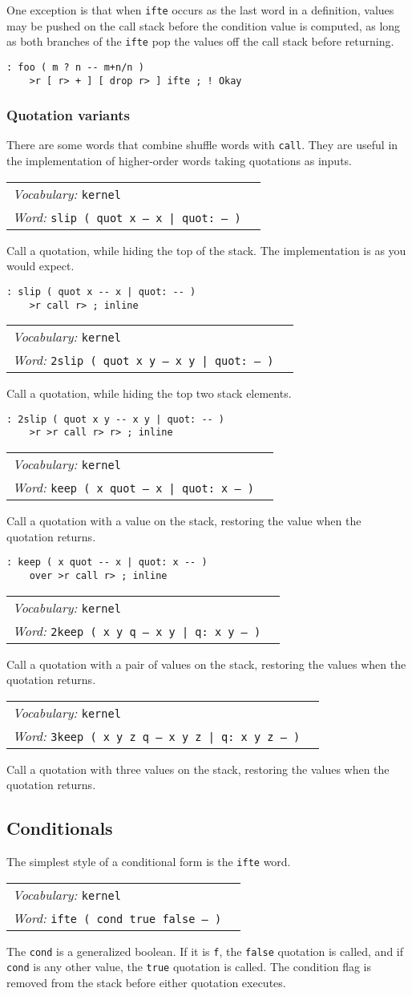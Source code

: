 \documentclass{book}
\newcommand{\vocabulary}[1]{\emph{Vocabulary:} \texttt{#1}&\\}
\newcommand{\ordinaryword}[2]{\index{\texttt{#1}}\emph{Word:} \texttt{#2}&\\}
\newcommand{\wordtable}[1]{


\begin{tabularx}{12cm}{lX}
\hline
#1
\hline
\end{tabularx}

}
\begin{document}
One exception is that when \texttt{ifte} occurs as the last word in a definition, values may be pushed on the call stack before the condition value is computed, as long as both branches of the \texttt{ifte} pop the values off the call stack before returning.
\begin{verbatim}
: foo ( m ? n -- m+n/n )
    >r [ r> + ] [ drop r> ] ifte ; ! Okay
\end{verbatim}

\subsubsection{Quotation variants}

There are some words that combine shuffle words with \texttt{call}. They are useful in the implementation of higher-order words taking quotations as inputs.
\wordtable{
\vocabulary{kernel}
\ordinaryword{slip}{slip ( quot x -- x | quot:~-- )}
}
Call a quotation, while hiding the top of the stack. The implementation is as you would expect.
\begin{verbatim}
: slip ( quot x -- x | quot: -- )
    >r call r> ; inline
\end{verbatim}
\wordtable{
\vocabulary{kernel}
\ordinaryword{2slip}{2slip ( quot x y -- x y | quot:~-- )}
}
Call a quotation, while hiding the top two stack elements.
\begin{verbatim}
: 2slip ( quot x y -- x y | quot: -- )
    >r >r call r> r> ; inline
\end{verbatim}
\wordtable{
\vocabulary{kernel}
\ordinaryword{keep}{keep ( x quot -- x | quot:~x -- )}
}
Call a quotation with a value on the stack, restoring the value when the quotation returns.
\begin{verbatim}
: keep ( x quot -- x | quot: x -- )
    over >r call r> ; inline
\end{verbatim}
\wordtable{
\vocabulary{kernel}
\ordinaryword{2keep}{2keep ( x y q -- x y | q:~x y -- )}
}
Call a quotation with a pair of values on the stack, restoring the values when the quotation returns.
\wordtable{
\vocabulary{kernel}
\ordinaryword{3keep}{3keep ( x y z q -- x y z | q:~x y z -- )}
}
Call a quotation with three values on the stack, restoring the values when the quotation returns.

\subsection{Conditionals}

The simplest style of a conditional form is the \texttt{ifte} word.
\wordtable{
\vocabulary{kernel}
\ordinaryword{ifte}{ifte ( cond true false -- )}
}
The \texttt{cond} is a generalized boolean. If it is \texttt{f}, the \texttt{false} quotation is called, and if \texttt{cond} is any other value, the \texttt{true} quotation is called. The condition flag is removed from the stack before either quotation executes.
\end{document}
